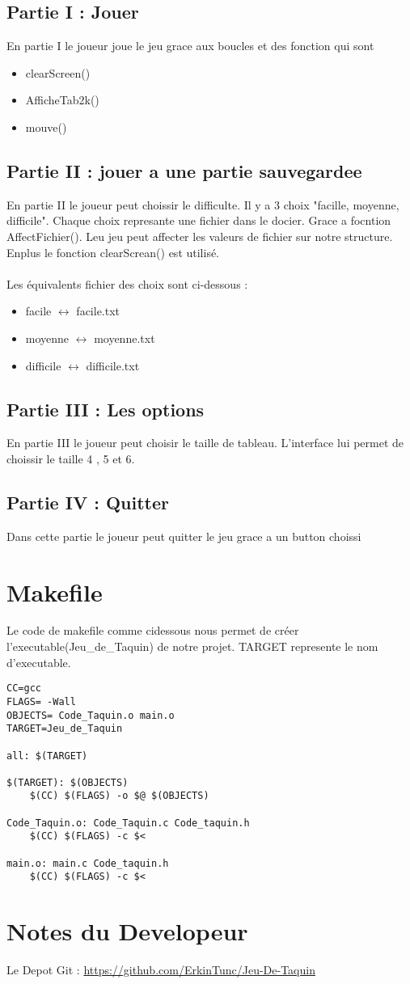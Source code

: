 \documentclass{article}
\begin{document}
\subsection{Partie I : Jouer}
En partie I le joueur joue le jeu grace aux boucles et des fonction qui sont 

\begin{itemize}
	\item clearScreen()
	\item AfficheTab2k()
	\item mouve()
\end{itemize}


\subsection{Partie II : jouer a une partie sauvegardee}
En partie II le joueur peut choissir le difficulte.
Il y a 3 choix "facille, moyenne, difficile".
Chaque choix represante une fichier dans le docier.
Grace a focntion AffectFichier(). Leu jeu peut affecter les valeurs de fichier sur notre structure.
Enplus le fonction clearScrean() est utilisé.
\\ \\
Les équivalents fichier des choix sont ci-dessous : 

\begin{itemize}
	\item facile $\leftrightarrow$ facile.txt
	\item moyenne $\leftrightarrow$ moyenne.txt
	\item difficile $\leftrightarrow$ difficile.txt
\end{itemize}


\subsection{Partie III : Les options}
En partie III le joueur peut choisir le taille de tableau. L'interface lui permet de choissir le taille 4 , 5 et 6.

\subsection{Partie IV : Quitter}
Dans cette partie le joueur peut quitter le jeu grace a un button choissi

\section{Makefile}
Le code de makefile comme ci\-dessous nous permet de créer l'executable(Jeu\_de\_Taquin) de notre projet.
TARGET represente le nom d'executable.
\begin{lstlisting}
CC=gcc
FLAGS= -Wall
OBJECTS= Code_Taquin.o main.o
TARGET=Jeu_de_Taquin

all: $(TARGET)

$(TARGET): $(OBJECTS)
	$(CC) $(FLAGS) -o $@ $(OBJECTS)

Code_Taquin.o: Code_Taquin.c Code_taquin.h
	$(CC) $(FLAGS) -c $<

main.o: main.c Code_taquin.h
	$(CC) $(FLAGS) -c $<
\end{lstlisting}

\section{Notes du Developeur}
Le Depot Git : \url{https://github.com/ErkinTunc/Jeu-De-Taquin} \\
\end{document}
